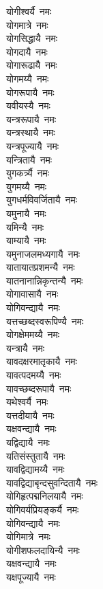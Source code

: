 \begin{flushleft}
\begin{multicols}{2}
योगीश्वर्यै~नमः\\
योगमात्रे~नमः\\
योगसिद्धायै~नमः\\
योगदायै~नमः\\
योगारूढायै~नमः\\
योगमय्यै~नमः\\
योगरूपायै~नमः\\
यवीयस्यै~नमः\hfill{}\\
यन्त्ररूपायै~नमः\\
यन्त्रस्थायै~नमः\\
यन्त्रपूज्यायै~नमः\\
यन्त्रितायै~नमः\\
युगकर्त्र्यै~नमः\\
युगमय्यै~नमः\\
युगधर्मविवर्जितायै~नमः\\
यमुनायै~नमः\\
यमिन्यै~नमः\\
याम्यायै~नमः\hfill{}\\
यमुनाजलमध्यगायै~नमः\\
यातायातप्रशमन्यै~नमः\\
यातनानान्निकृन्तन्यै~नमः\\
योगावासायै~नमः\\
योगिवन्द्यायै~नमः\\
यत्तच्छब्दस्वरूपिण्यै~नमः\\
योगक्षेममय्यै~नमः\\
यन्त्रायै~नमः\\
यावदक्षरमातृकायै~नमः\\
यावत्पदमय्यै~नमः\hfill{}\\
यावच्छब्दरूपायै~नमः\\
यथेश्वर्यै~नमः\\
यत्तदीयायै~नमः\\
यक्षवन्द्यायै~नमः\\
यद्विद्यायै~नमः\\
यतिसंस्तुतायै~नमः\\
यावद्विद्यामय्यै~नमः\\
यावद्विद्याबृन्दसुवन्दितायै~नमः\\
योगिहृत्पद्मनिलयायै~नमः\\
योगिवर्यप्रियङ्कर्यै~नमः\hfill{}\\
योगिवन्द्यायै~नमः\\
योगिमात्रे~नमः\\
योगीशफलदायिन्यै~नमः\\
यक्षवन्द्यायै~नमः\\
यक्षपूज्यायै~नमः\\

\end{multicols}
\end{flushleft}
